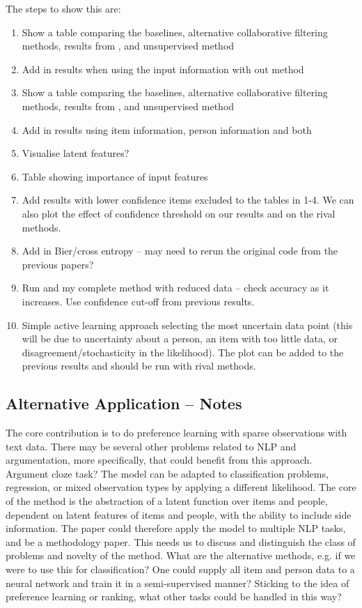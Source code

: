 The steps to show this are:
\begin{enumerate}
  \item Show a table comparing the baselines, alternative collaborative filtering methods, 
  results from \cite{habernal2016argument}, and unsupervised method
  \item Add in results when using the input information with out method
  \item Show a table comparing the baselines, alternative collaborative filtering methods, 
  results from \cite{lukin2017argument}, and unsupervised method
  \item Add in results using item information, person information and both
  \item Visualise latent features?
  \item Table showing importance of input features
  \item Add results with lower confidence items excluded to the tables in 1-4. We can also plot the
  effect of confidence threshold on our results and on the rival methods.
  \item Add in Bier/cross entropy -- may need to rerun the original code from the previous papers?
  \item Run \cite{habernal2016argument} and my complete method with reduced data -- check accuracy as it increases. Use confidence cut-off from previous results.
  \item Simple active learning approach selecting the most uncertain data point (this will be due to 
  uncertainty about a person, an item with too little data, or disagreement/stochasticity in the likelihood). The plot can be added to the previous results and should be run with rival methods.
\end{enumerate}

\subsection{Alternative Application -- Notes}

The core contribution is to do preference learning with sparse observations with text data. 
There may be several other problems related to NLP and argumentation, more specifically, that
could benefit from this approach. 
Argument cloze task? 
The model can be adapted to classification problems, regression, or mixed observation types by applying a different likelihood. The core of the method is the abstraction of a latent function over items and people, dependent on latent features of items and people, with the ability to include side information.
The paper could therefore apply the model to multiple NLP tasks, and be a methodology paper. 
This needs us to discuss and distinguish the class of problems and novelty of the method. 
What are the alternative methods, e.g. if we were to use this for classification? One could supply all 
item and person data to a neural network and train it in a semi-supervised manner?
Sticking to the idea of preference learning or ranking, what other tasks could be handled in this way?

